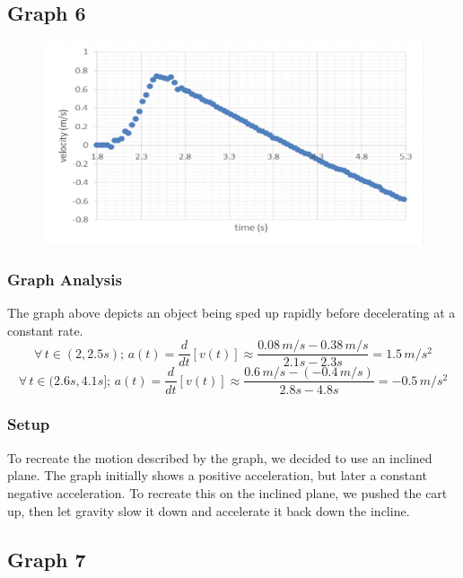 \documentclass[11pt, letterpaper, includehead]{article}
\begin{document}
  \subsection{Graph 6}

  \begin{figure}[H] %
    \centering 
    \includegraphics[width=\linewidth]{graph_6.png}
  \end{figure}

  \subsubsection{Graph Analysis}
  The graph above depicts an object being sped up rapidly before decelerating
  at a constant rate.
  $$\forall \, t \in (2, 2.5s); \, a(t) = \frac{d}{dt}[v(t)] \approx \frac{0.08 \, m/s - 0.38 \, m/s}{2.1s - 2.3s} = 1.5 \, m/s^2$$
  $$\forall \, t \in (2.6s, 4.1s]; \, a(t) = \frac{d}{dt}[v(t)] \approx \frac{0.6 \, m/s -(-0.4 \, m/s)}{2.8s - 4.8s} = -0.5 \, m/s^2$$ 
  \subsubsection{Setup}
  To recreate the motion described by the graph, we decided to use an inclined plane.
  The graph initially shows a positive acceleration, but later a constant negative acceleration.
  To recreate this on the inclined plane, we pushed the cart up, then let
  gravity slow it down and accelerate it back down the incline.


  \subsection{Graph 7}
\end{document}
